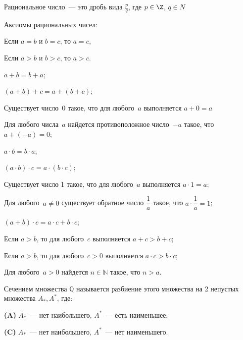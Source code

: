 \setcounter{section}{0}

\begin{definition}
Рациональное число~--- это дробь вида \(\frac{p}{q}\), где \(p \in \Z\),
\(q \in N\)
\end{definition}

Аксиомы рациональных чисел:

\begin{properties}
\item Если \(a = b\) и \(b = c\), то \(a = c\),

Если \(a > b\) и \(b > c\), то \(a > c\).

\item \(a + b = b + a\);
\item \((a + b) + c = a + (b + c)\);
\item Существует число~\(0\) такое, что для любого~\(a\) выполняется \(a + 0 = a\)
\item Для любого числа~\(a\) найдется противоположное число~\(-a\) такое,
что \(a + (-a) = 0\);
\item \(a \cdot b = b \cdot a\);
\item \((a \cdot b) \cdot c = a \cdot (b \cdot c)\);
\item Существует число 1 такое, что для любого~\(a\) выполняется \(a \cdot 1 = a\);
\item Для любого~\(a \neq 0\) существует обратное число \(\dfrac{1}{a}\) такое,
что \(a \cdot \dfrac{1}{a} = 1\);
\item \((a + b) \cdot c = a \cdot c + b \cdot c\);
\item Если \(a > b\), то для любого~\(c\) выполняется \(a + c > b + c\);
\item Если \(a > b\), то для любого~\(c > 0\) выполняется \(a \cdot c > b \cdot c\);
\item Для любого~\(a > 0\) найдется \(n \in \mathbb{N}\) такое, что \(n > a\).
\end{properties}

\begin{definition}
Сечением множества \(\mathbb{Q}\) называется разбиение этого множества
на 2 непустых множества \(A_*, A^*\), где:

\textbf{(A)} \(A_*\)~--- нет наибольшего, \(A^*\)~--- есть наименьшее;

\textbf{(C)} \(A_*\)~--- нет наибольшего, \(A^*\)~--- нет наименьшего.

\end{definition}


